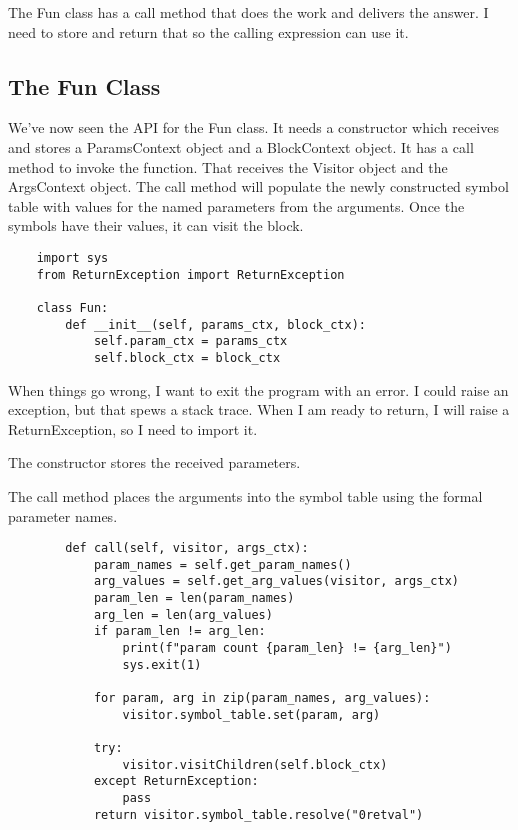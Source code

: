 The Fun class has a call method that does the work and delivers the
answer. I need to store and return that so the calling expression can
use it.

\subsection{The Fun Class}

We've now seen the API for the Fun class. It needs a constructor which
receives and stores a ParamsContext object and a BlockContext object.
It has a call method to invoke the function. That receives the Visitor object
and the ArgsContext object. The call method will populate the newly constructed
symbol table with values for the named parameters from
the arguments. Once the symbols have their values, it can visit the block.

{\footnotesize
\begin{verbatim}
    import sys
    from ReturnException import ReturnException

    class Fun:
        def __init__(self, params_ctx, block_ctx):
            self.param_ctx = params_ctx
            self.block_ctx = block_ctx
\end{verbatim}
}

When things go wrong, I want to exit the program with an error. I could
raise an exception, but that spews a stack trace. When I am ready to
return, I will raise a ReturnException, so I need to import it.

The constructor stores the received parameters.

The call method places the arguments into the symbol table using the
formal parameter names.

{\footnotesize
\begin{verbatim}
        def call(self, visitor, args_ctx):
            param_names = self.get_param_names()
            arg_values = self.get_arg_values(visitor, args_ctx)
            param_len = len(param_names)
            arg_len = len(arg_values)
            if param_len != arg_len:
                print(f"param count {param_len} != {arg_len}")
                sys.exit(1)

            for param, arg in zip(param_names, arg_values):
                visitor.symbol_table.set(param, arg)

            try:
                visitor.visitChildren(self.block_ctx)
            except ReturnException:
                pass
            return visitor.symbol_table.resolve("0retval")
\end{verbatim}
}

